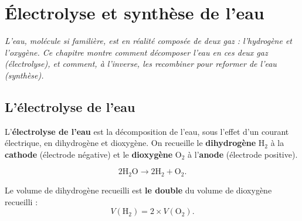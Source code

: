 \chapter{Électrolyse et synthèse de l'eau}

\noindent\textit{L'eau, molécule si familière, est en réalité composée de deux gaz :
l'hydrogène et l'oxygène. Ce chapitre montre comment décomposer l'eau en ces deux gaz
(électrolyse), et comment, à l'inverse, les recombiner pour reformer de l'eau (synthèse).}
\vspace{8pt}

\connecteBanner

\section{L'électrolyse de l'eau}

\begin{definition}
L'\textbf{électrolyse de l'eau} est la décomposition de l'eau, sous l'effet d'un courant
électrique, en dihydrogène et dioxygène. On recueille le \textbf{dihydrogène} $\mathrm{H_2}$
à la \textbf{cathode} (électrode négative) et le \textbf{dioxygène} $\mathrm{O_2}$ à
l'\textbf{anode} (électrode positive).
\end{definition}

\begin{propriete}
\[
2\mathrm{H_2O}\longrightarrow2\mathrm{H_2}+\mathrm{O_2}.
\]
\end{propriete}

\begin{propriete}
Le volume de dihydrogène recueilli est \textbf{le double} du volume de dioxygène recueilli
:
\[
V(\mathrm{H_2})=2\times V(\mathrm{O_2}).
\]
\end{propriete}

\begin{illus}
\end{illus}

